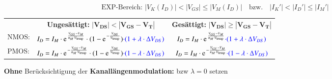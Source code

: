 \[ \boxed{ \text{EXP-Bereich: } |V_K(I_D)| < |V_{GS}| \leq |V_M(I_D)| \quad \text{bzw.} \quad |I_K'| < |I_D'| \leq |I_M'| } \]  %


\resizebox{\columnwidth}{!}
{
    \renewcommand{\arraystretch}{1.5}
    \begin{tabular}{@{}l c | c@{}}
                & \textbf{Ungesättigt:} \quad $\bm{| V_{DS} | < | V_{GS} - V_T |}$                                                                                                  & \textbf{Gesättigt:} \quad $\bm{| V_{DS} | \geq | V_{GS} - V_T |}$                                                     \\
        NMOS:   & $I_D = I_M \cdot \e^{\frac{V_{GS} - V_M}{n_M \cdot V_\text{temp}}} \cdot (1 - \e^{-\frac{V_{DS}}{V_\text{temp}}}) \cbl{\cdot (1 + \lambda \cdot \Delta V_{DS})}$  & $I_D = I_M \cdot \e^{\frac{V_{GS} - V_M}{n_M \cdot V_\text{temp}}} \cbl{\cdot (1 + \lambda \cdot \Delta V_{DS})}$     \\
        \midrule
        PMOS:   & $I_D = I_M \cdot \e^{- \frac{V_{GS} - V_M}{n_M \cdot V_\text{temp}}} \cdot (1 - \e^{\frac{V_{DS}}{V_\text{temp}}}) \cbl{\cdot (1 - \lambda \cdot \Delta V_{DS})}$ & $I_D = I_M \cdot \e^{- \frac{V_{GS} - V_M}{n_M \cdot V_\text{temp}}} \cbl{\cdot (1 - \lambda \cdot \Delta V_{DS})}$   \\
    \end{tabular}
    \renewcommand{\arraystretch}{1}
}

\medskip

\textbf{Ohne} Berücksichtigung der \textbf{Kanallängenmodulation:}  bzw $\lambda = 0$ setzen






